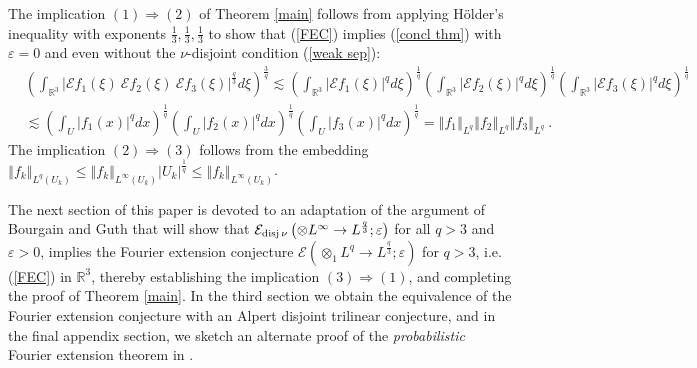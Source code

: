 \documentclass{amsart}%
\theoremstyle{plain}
\numberwithin{equation}{section}
\begin{document}
The implication $\left(  1\right)  \Longrightarrow\left(  2\right)  $ of
Theorem \ref{main} follows from applying H\"{o}lder's inequality with
exponents $\frac{1}{3},\frac{1}{3},\frac{1}{3}$ to show that (\ref{FEC})
implies (\ref{concl thm}) with $\varepsilon=0$ and even without the $\nu
$-disjoint condition (\ref{weak sep}):%
\begin{align*}
&  \left(  \int_{\mathbb{R}^{3}}\left\vert \mathcal{E}f_{1}\left(  \xi\right)
\ \mathcal{E}f_{2}\left(  \xi\right)  \ \mathcal{E}f_{3}\left(  \xi\right)
\right\vert ^{\frac{q}{3}}d\xi\right)  ^{\frac{3}{q}}\lesssim\left(
\int_{\mathbb{R}^{3}}\left\vert \mathcal{E}f_{1}\left(  \xi\right)
\right\vert ^{q}d\xi\right)  ^{\frac{1}{q}}\left(  \int_{\mathbb{R}^{3}%
}\left\vert \mathcal{E}f_{2}\left(  \xi\right)  \right\vert ^{q}d\xi\right)
^{\frac{1}{q}}\left(  \int_{\mathbb{R}^{3}}\left\vert \mathcal{E}f_{3}\left(
\xi\right)  \right\vert ^{q}d\xi\right)  ^{\frac{1}{q}}\\
&  \lesssim\left(  \int_{U}\left\vert f_{1}\left(  x\right)  \right\vert
^{q}dx\right)  ^{\frac{1}{q}}\left(  \int_{U}\left\vert f_{2}\left(  x\right)
\right\vert ^{q}dx\right)  ^{\frac{1}{q}}\left(  \int_{U}\left\vert
f_{3}\left(  x\right)  \right\vert ^{q}dx\right)  ^{\frac{1}{q}}=\left\Vert
f_{1}\right\Vert _{L^{q}}\left\Vert f_{2}\right\Vert _{L^{q}}\left\Vert
f_{3}\right\Vert _{L^{q}}\ .
\end{align*}
The implication $\left(  2\right)  \Longrightarrow\left(  3\right)  $ follows
from the embedding $\left\Vert f_{k}\right\Vert _{L^{q}\left(  U_{k}\right)
}\leq\left\Vert f_{k}\right\Vert _{L^{\infty}\left(  U_{k}\right)  }\left\vert
U_{k}\right\vert ^{\frac{1}{q}}\leq\left\Vert f_{k}\right\Vert _{L^{\infty
}\left(  U_{k}\right)  }$.

The next section of this paper is devoted to an adaptation of the argument of
Bourgain and Guth \cite[Section 2]{BoGu} that will show that $\mathcal{E}%
_{\mathop{\rm disj}\nu}\left(  \otimes L^{\infty}\rightarrow L^{\frac{q}{3}%
};\varepsilon\right)  $ for all $q>3$ and $\varepsilon>0$, implies the Fourier
extension conjecture $\mathcal{E}\left(  \otimes_{1}L^{q}\rightarrow
L^{\frac{q}{3}};\varepsilon\right)  $ for $q>3$, i.e. (\ref{FEC}) in
$\mathbb{R}^{3}$, thereby establishing the implication $\left(  3\right)
\Longrightarrow\left(  1\right)  $, and completing the proof of Theorem
\ref{main}. In the third section we obtain the equivalence of the Fourier
extension conjecture with an Alpert disjoint trilinear conjecture, and in the
final appendix section, we sketch an alternate proof of the
\emph{probabilistic} Fourier extension theorem in \cite{Saw7}.
\end{document}
